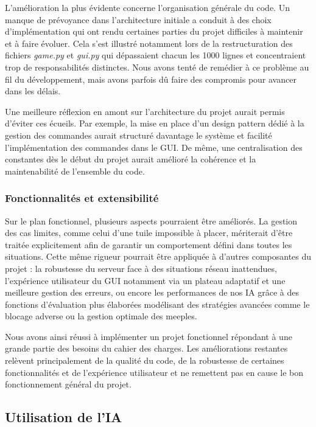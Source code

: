 \documentclass[11pt]{article}
\begin{document}
L'amélioration la plus évidente concerne l'organisation générale du code. 
Un manque de prévoyance dans l'architecture initiale a conduit à des choix 
d'implémentation qui ont rendu certaines parties du projet difficiles à 
maintenir et à faire évoluer. Cela s'est illustré notamment lors de la 
restructuration des fichiers \textit{game.py} et \textit{gui.py} qui 
dépassaient chacun les 1000 lignes et concentraient trop de 
responsabilités distinctes. Nous avons tenté de remédier à ce problème 
au fil du développement, mais avons parfois dû faire des compromis pour 
avancer dans les délais.

Une meilleure réflexion en amont sur l'architecture du projet aurait 
permis d'éviter ces écueils. Par exemple, la mise en place d'un design 
pattern dédié à la gestion des commandes aurait structuré davantage le 
système et facilité l'implémentation des commandes dans le GUI. De même, 
une centralisation des constantes dès le début du projet aurait amélioré 
la cohérence et la maintenabilité de l'ensemble du code.

\subsubsection*{Fonctionnalités et extensibilité}

Sur le plan fonctionnel, plusieurs aspects pourraient être améliorés.
La gestion des cas limites, comme celui d'une tuile impossible à placer,
mériterait d'être traitée explicitement afin de garantir un comportement
défini dans toutes les situations. Cette même rigueur pourrait être
appliquée à d'autres composantes du projet : la robustesse du serveur
face à des situations réseau inattendues, l'expérience utilisateur du
GUI notamment via un plateau adaptatif et une meilleure gestion des
erreurs, ou encore les performances de nos IA grâce à des fonctions
d'évaluation plus élaborées modélisant des stratégies avancées comme
le blocage adverse ou la gestion optimale des meeples.

Nous avons ainsi réussi à implémenter un projet fonctionnel répondant 
à une grande partie des besoins du cahier des charges. Les améliorations 
restantes relèvent principalement de la qualité du code, de la robustesse 
de certaines fonctionnalités et de l'expérience utilisateur et ne 
remettent pas en cause le bon fonctionnement général du projet.

\subsection{Utilisation de l'IA}
\end{document}
